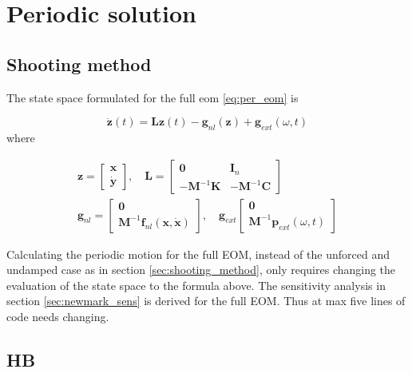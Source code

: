 
\chapter{Periodic solution}
\label{chap:per_sol}

\section{Shooting method}
\label{sec:shooting_appendix}

The state space formulated for the full eom \eqref{eq:per_eom} is

\begin{equation}
  \label{eq:app_state_space}
  \dot{\bm z}(t) = \bm L\bm z(t) - \bm g_{nl}(\bm z) + \bm g_{ext}(\omega,t)
\end{equation}
where

\begin{equation}
  \begin{aligned}
    \bm z =
    \begin{bmatrix}
      \bm x \\ \dot{\bm y}
    \end{bmatrix}, \quad
    \bm L =
    \begin{bmatrix}
      \bm 0 & \bm I_n \\
      -\bm M^{-1}\bm K & -\bm M^{-1} \bm C
    \end{bmatrix} \\
    \bm g_{nl} =
    \begin{bmatrix}
      \bm 0 \\ \bm M^{-1} \bm f_{nl}(\bm x, \dot{\bm x})
    \end{bmatrix}, \quad
    \bm g_{ext}
    \begin{bmatrix}
      \bm 0 \\ \bm M^{-1} \bm p_{ext}(\omega, t)
    \end{bmatrix}
  \end{aligned}
\end{equation}

Calculating the periodic motion for the full EOM, instead of the unforced and
undamped case as in section \ref{sec:shooting_method}, only requires changing
the evaluation of the state space to the formula above. The sensitivity analysis
in section \ref{sec:newmark_sens} is derived for the full EOM. Thus at max five
lines of code needs changing.

\section{HB}
\label{sec:hb_appendix}

